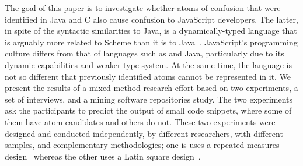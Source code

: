The goal of this paper is to investigate whether atoms of confusion that were identified in Java and C also cause confusion to JavaScript developers. The latter, in spite of the syntactic similarities to Java, is a dynamically-typed language that is arguably more related to Scheme than it is to Java~\cite{Eich:2018:BHJ}. 
JavaScript's programming culture differs from that of languages such as \clang and Java, particularly due to its dynamic capabilities and weaker type system. At the same time, the language is not so different that previously identified atoms cannot be represented in it. 
We present the results of a mixed-method research effort based on two experiments, a set of interviews, and a mining software repositories study. The two experiments ask the participants to predict the output of small code snippets, where some of them have atom candidates and others do not. These two experiments were designed and conducted independently, by different researchers, with different samples, and complementary methodologies; one is uses a repeated measures design~\cite{Keselman:2001:ARM} whereas the other uses a Latin square design~\cite{Hunter-Experimenters}.  

